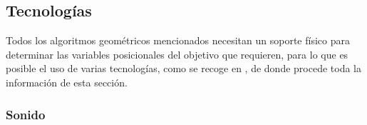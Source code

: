 




\subsection{Tecnologías}

Todos los algoritmos geométricos mencionados necesitan un soporte físico para determinar las variables posicionales del objetivo que requieren, para lo que es posible el uso de varias tecnologías, como se recoge en \cite{COMP}, de donde procede toda la información de esta sección.

\subsubsection{Sonido}

